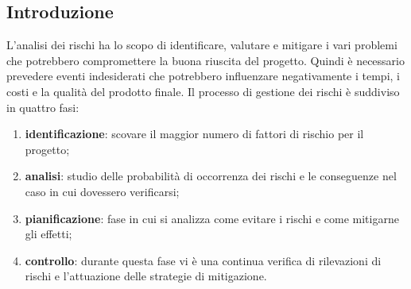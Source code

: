 \subsection{Introduzione}
L'analisi dei rischi ha lo scopo di identificare, valutare e mitigare i vari problemi che potrebbero compromettere la buona riuscita del progetto. 
Quindi è necessario prevedere eventi indesiderati che potrebbero influenzare negativamente i tempi, i costi e la qualità del prodotto finale.
Il processo di gestione dei rischi è suddiviso in quattro fasi:
\begin{enumerate}
    \item \textbf{identificazione}: scovare il maggior numero di fattori di rischio per il progetto;
    \item \textbf{analisi}: studio delle probabilità di occorrenza dei rischi e le conseguenze nel caso in cui dovessero verificarsi;
    \item \textbf{pianificazione}: fase in cui si analizza come evitare i rischi e come mitigarne gli effetti;
    \item \textbf{controllo}: durante questa fase vi è una continua verifica di rilevazioni di rischi e l'attuazione delle strategie di mitigazione. 
\end{enumerate}